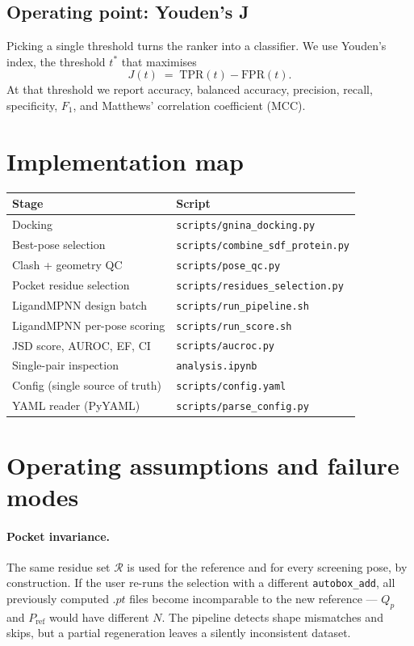 \documentclass[11pt]{article}
\begin{document}
\subsection{Operating point: Youden's J}

Picking a single threshold turns the ranker into a classifier. We use
Youden's index, the threshold $t^*$ that maximises
\[
J(t) \;=\; \mathrm{TPR}(t) - \mathrm{FPR}(t).
\]
At that threshold we report accuracy, balanced accuracy, precision,
recall, specificity, $F_1$, and Matthews' correlation coefficient (MCC).

\section{Implementation map}

\begin{center}
\begin{tabular}{ll}
\toprule
Stage & Script \\
\midrule
Docking                        & \texttt{scripts/gnina\_docking.py} \\
Best-pose selection            & \texttt{scripts/combine\_sdf\_protein.py} \\
Clash + geometry QC            & \texttt{scripts/pose\_qc.py} \\
Pocket residue selection       & \texttt{scripts/residues\_selection.py} \\
LigandMPNN design batch        & \texttt{scripts/run\_pipeline.sh} \\
LigandMPNN per-pose scoring    & \texttt{scripts/run\_score.sh} \\
JSD score, AUROC, EF, CI       & \texttt{scripts/aucroc.py} \\
Single-pair inspection         & \texttt{analysis.ipynb} \\
Config (single source of truth)& \texttt{scripts/config.yaml} \\
YAML reader (PyYAML)           & \texttt{scripts/parse_config.py} \\
\bottomrule
\end{tabular}
\end{center}

\section{Operating assumptions and failure modes}

\paragraph{Pocket invariance.}
The same residue set $\mathcal{R}$ is used for the reference and for every
screening pose, by construction. If the user re-runs the selection with a
different \texttt{autobox\_add}, all previously computed $.pt$ files
become incomparable to the new reference --- $Q_p$ and $P_{\mathrm{ref}}$
would have different $N$. The pipeline detects shape mismatches and
skips, but a partial regeneration leaves a silently inconsistent dataset.
\end{document}
